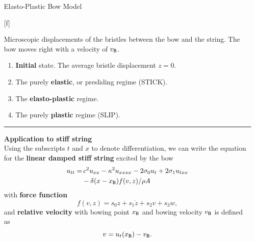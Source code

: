 \documentclass[a0paper,portrait]{baposter}
\let\oldtext\text
\renewcommand{\text}[1]{\oldtext{\fontfamily{ptm}\selectfont #1}}
\let\oldbf\textbf
\renewcommand{\textbf}[1]{\textcolor{aaublue1}{\oldbf{#1}}}
\begin{document}
\begin{poster}
\begin{posterbox}[name=elasto,column=0,below=intro, above=bottom]{Elasto-Plastic Bow Model}
\begin{center}
\begin{tikzpicture}[scale=0.84, every node/.style={transform shape}]
    \end{tikzpicture}
    \captionsetup{singlelinecheck=off}
    [f]{%
    Microscopic displacements of the bristles between the bow and the string. The bow moves right with a velocity of $v_\text{B}$.
    \begin{enumerate}[labelindent=-2.4pt, label=\alph*), font=\color{black}]
        \item \textbf{Initial} state. The average bristle displacement $z=0$.
        \item The purely \textbf{elastic}, or presliding regime (STICK).
        \item The \textbf{elasto-plastic} regime. 
        \item The purely \textbf{plastic} regime (SLIP).
    \end{enumerate}
}
    \label{fig:elasto}
    \end{center}
    \hrule
    \vspace{0.2cm}
    {\large \textbf{Application to stiff string}}\\
        Using the subscripts $t$ and $x$ to denote differentiation, we can write the equation for the \textbf{linear damped stiff string} excited by the bow
    \begin{equation}
\begin{aligned}\label{eq:stiffString}
  u_{tt} = &\, c^2u_{xx}-\kappa^2u_{xxxx}-2\sigma_0u_t+2\sigma_1u_{txx}\\
  &-\delta(x-x_\text{B})f(v,z)/\rho A
  \end{aligned}
\end{equation}
with \textbf{force function}
\vspace{0.1cm}
\begin{equation}
    f(v,z) = s_0z+s_1\dot{z}+s_2v+s_3w,
\end{equation}
    and \textbf{relative velocity} with bowing point $x_\text{B}$ and bowing velocity $v_\text{B}$ is defined as
\begin{equation}
    v = u_t(x_\text{B})-v_\text{B}.
\end{equation}


\end{posterbox}
\end{poster}
\end{document}
